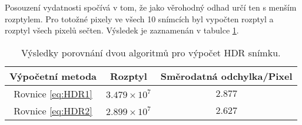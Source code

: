 Posouzení vydatnosti spočívá v tom, že jako věrohodný odhad určí ten s menším rozptylem. Pro totožné pixely ve všech 10 snímcích byl vypočten rozptyl a rozptyl všech pixelů sečten. Výsledek je zaznamenán v tabulce \ref{tab: porovnani}.

\begin{table}[h!]


\begin{tabular}{c|c|c}

Výpočetní metoda		&	Rozptyl  			&	 Směrodatná odchylka/Pixel\\
\hline\hline
Rovnice \ref{eq:HDR1} 	&	$3.479\times10^7$	& $2.877$\\
\hline
Rovnice \ref{eq:HDR2}	&	$2.899\times10^7$	& $2.627$


\end{tabular}   
 
\caption{Výsledky porovnání dvou algoritmů pro výpočet HDR snímku.}
\label{tab: porovnani} 
\end{table}


